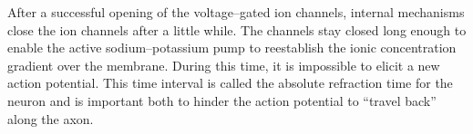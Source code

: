 		After a successful opening of the voltage--gated ion channels, internal mechanisms close the ion channels after a little while.
		The channels stay closed long enough to enable the active sodium--potassium pump to reestablish the ionic concentration gradient over the membrane.
		During this time, it is impossible to elicit a new action potential.
		This time interval is called the absolute refraction time for the neuron and is important both to hinder the action potential to ``travel back'' along the axon.
		\cite{NeuroscienceExploringTheBrain3edKAP4} %


%		


	

